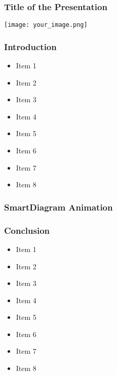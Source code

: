 \documentclass{beamer}
\begin{document}
\begin{frame}
    \frametitle{Title of the Presentation}
    \begin{center}
        \texttt{[image: your\_image.png]} %
    \end{center}
\end{frame}

\begin{frame}
    \frametitle{Introduction}
    \begin{itemize}
        \item Item 1
        \item Item 2
        \item Item 3
        \item Item 4
        \item Item 5
        \item Item 6
        \item Item 7
        \item Item 8
    \end{itemize}
\end{frame}

\begin{frame}
    \frametitle{SmartDiagram Animation}
    \begin{center}
    \end{center}
\end{frame}

\begin{frame}
    \frametitle{Conclusion}
    \begin{itemize}
        \item Item 1
        \item Item 2
        \item Item 3
        \item Item 4
        \item Item 5
        \item Item 6
        \item Item 7
        \item Item 8
    \end{itemize}
\end{frame}
\end{document}
